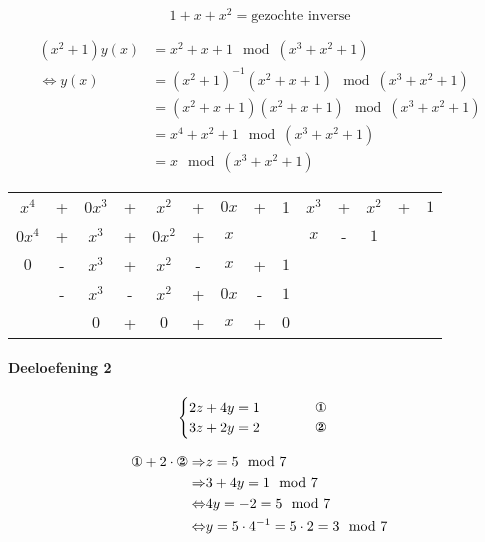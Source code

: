 \documentclass[12pt]{article}
\begin{document}
	\begin{equation}
		1+x+x^{2} = \text{gezochte inverse} 
	\end{equation}

	\begin{align}
	(x^{2}+1)y(x) &= x^{2}+x+1 \mod(x^{3}+x^{2}+1) \\
	\Leftrightarrow y(x) &= (x^{2}+1)^{-1} (x^{2}+x+1) \mod(x^{3}+x^{2}+1) \\
	&= (x^{2}+x+1)(x^{2}+x+1) \mod(x^{3}+x^{2}+1) \\
	&= x^{4}+x^{2}+1 \mod(x^{3}+x^{2}+1) \\
	&= x \mod(x^{3}+x^{2}+1)
	\end{align}

	\begin{table}[H]
	\centering
	\begin{tabular}{ccccccccc|ccccc}
		$x^{4}$&+&$0x^{3}$&+&$x^{2}$&+&$0x$&+&1&$x^{3}$&+&$x^{2}$&+&$1$ \\
		\cline{10-14}
		$0x^{4}$&+&$x^{3}$&+&$0x^{2}$&+&$x$& & &$x$&-&$1$& & \\
		\cline{1-9}
		$0$&-&$x^{3}$&+&$x^{2}$&-&$x$&+&$1$   &&&&& \\
		 &-&$x^{3}$&-&$x^{2}$&+&$0x$&-&$1$   &&&&& \\
		\cline{2-9}
		 & &$0$&+&$0$&+&$x$&+&$0$   &&&&& \\
	\end{tabular}
	\end{table}

	\paragraph{Deeloefening 2}
	
	\begin{equation}
		\begin{cases}
			2z + 4y = 1 \qquad \qquad \text{\ding{172}} \\
			3z + 2y = 2 \qquad \qquad \text{\ding{173}}
		\end{cases}
	\end{equation}


	\begin{align}
		\text{\ding{172}}+2 \cdot \text{\ding{173}} \Rightarrow & z = 5 \mod 7 \\
		\Rightarrow & 3+4y = 1 \mod 7 \\
		\Leftrightarrow & 4y = -2 = 5 \mod 7 \\
		\Leftrightarrow & y = 5 \cdot 4^{-1} = 5 \cdot 2 = 3 \mod 7
	\end{align}
\end{document}
